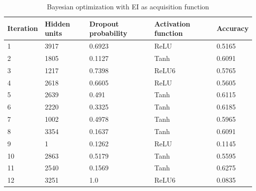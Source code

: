 \documentclass[12pt,fleqn]{article}
\begin{document}
\begin{table}[H]
	\caption{Bayesian optimization with EI as acquisition function \label{EI}}
	\centering
	\begin{tabular}{|l|l|l|l|l|}
		\hline
		Iteration & Hidden units & Dropout probability & Activation function & Accuracy \\ \hline
		1 & 3917 & 0.6923 & ReLU & 0.5165 \\ \hline 

		2 & 1805 & 0.1127 & Tanh & 0.6091 \\ \hline 

		3 & 1217 & 0.7398 & ReLU6 & 0.5765 \\ \hline 

		4 & 2618 & 0.6605 & ReLU & 0.5605 \\ \hline 

		5 & 2639 & 0.491 & Tanh & 0.6115 \\ \hline 

		6 & 2220 & 0.3325 & Tanh & 0.6185 \\ \hline 

		7 & 1002 & 0.4978 & Tanh & 0.5965 \\ \hline 

		8 & 3354 & 0.1637 & Tanh & 0.6091 \\ \hline 

		9 & 1 & 0.1262 & ReLU & 0.1145 \\ \hline 

		10 & 2863 & 0.5179 & Tanh & 0.5595 \\ \hline 

		11 & 2540 & 0.1569 & Tanh & 0.6275 \\ \hline 

		12 & 3251 & 1.0 & ReLU6 & 0.0835 \\ \hline 

	\end{tabular}
\end{table}
\end{document}
